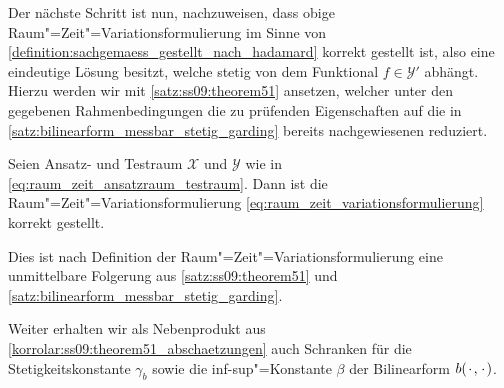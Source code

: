 \documentclass[../main.tex]{subfiles}
\begin{document}
Der nächste Schritt ist nun, nachzuweisen, dass obige Raum"=Zeit"=Variationsformulierung im Sinne von \cref{definition:sachgemaess_gestellt_nach_hadamard} korrekt gestellt ist, also eine eindeutige Lösung besitzt, welche stetig von dem Funktional $f \in \mathcal Y'$ abhängt.
Hierzu werden wir mit \cref{satz:ss09:theorem51} ansetzen, welcher unter den gegebenen Rahmenbedingungen die zu prüfenden Eigenschaften auf die in \cref{satz:bilinearform_messbar_stetig_garding} bereits nachgewiesenen reduziert.

\begin{Korollar}
\label{satz:raum_zeit_variationsformulierung_sachgemaess_gestellt}
    Seien Ansatz- und Testraum $\mathcal X$ und $\mathcal Y$ wie in \cref{eq:raum_zeit_ansatzraum_testraum}.
    Dann ist die Raum"=Zeit"=Variationsformulierung \cref{eq:raum_zeit_variationsformulierung} korrekt gestellt.

    \begin{Beweis}
        Dies ist nach Definition der Raum"=Zeit"=Variationsformulierung eine unmittelbare Folgerung aus \cref{satz:ss09:theorem51} und \cref{satz:bilinearform_messbar_stetig_garding}.
    \end{Beweis}
\end{Korollar}

Weiter erhalten wir als Nebenprodukt aus \cref{korrolar:ss09:theorem51_abschaetzungen} auch Schranken für die Stetigkeitskonstante $\gamma_{b}$ sowie die inf-sup"=Konstante $\beta$ der Bilinearform $b({\mkern2mu\cdot\mkern2mu}, {\mkern2mu\cdot\mkern2mu})$.
\end{document}
